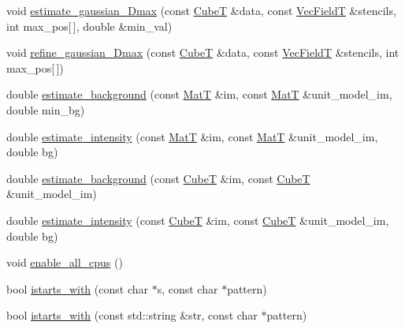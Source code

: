 \begin{DoxyCompactItemize}
\item 
void \hyperlink{namespacemappel_a2d597c426bd6287ad1a506511a68c9c2}{estimate\+\_\+gaussian\+\_\+Dmax} (const \hyperlink{namespacemappel_ab2afab4e6c8805e83946670d882768c2}{CubeT} \&data, const \hyperlink{namespacemappel_a834ec4f32487f07c0ca1e22d4928d1f8}{Vec\+FieldT} \&stencils, int max\+\_\+pos\mbox{[}$\,$\mbox{]}, double \&min\+\_\+val)
\item 
void \hyperlink{namespacemappel_ab65cc5c100590b4b5246984162e3e678}{refine\+\_\+gaussian\+\_\+Dmax} (const \hyperlink{namespacemappel_ab2afab4e6c8805e83946670d882768c2}{CubeT} \&data, const \hyperlink{namespacemappel_a834ec4f32487f07c0ca1e22d4928d1f8}{Vec\+FieldT} \&stencils, int max\+\_\+pos\mbox{[}$\,$\mbox{]})
\item 
double \hyperlink{namespacemappel_ae4735b28fdcd3dafd492d565357f7641}{estimate\+\_\+background} (const \hyperlink{namespacemappel_a7091ab87c528041f7e2027195fad8915}{MatT} \&im, const \hyperlink{namespacemappel_a7091ab87c528041f7e2027195fad8915}{MatT} \&unit\+\_\+model\+\_\+im, double min\+\_\+bg)
\item 
double \hyperlink{namespacemappel_acc51debd218d0e3181f7ddf32576f739}{estimate\+\_\+intensity} (const \hyperlink{namespacemappel_a7091ab87c528041f7e2027195fad8915}{MatT} \&im, const \hyperlink{namespacemappel_a7091ab87c528041f7e2027195fad8915}{MatT} \&unit\+\_\+model\+\_\+im, double bg)
\item 
double \hyperlink{namespacemappel_a5066b92cf654828129635a6ca61aaca4}{estimate\+\_\+background} (const \hyperlink{namespacemappel_ab2afab4e6c8805e83946670d882768c2}{CubeT} \&im, const \hyperlink{namespacemappel_ab2afab4e6c8805e83946670d882768c2}{CubeT} \&unit\+\_\+model\+\_\+im)
\item 
double \hyperlink{namespacemappel_a2d00c518aa213c069f09c666c25b026a}{estimate\+\_\+intensity} (const \hyperlink{namespacemappel_ab2afab4e6c8805e83946670d882768c2}{CubeT} \&im, const \hyperlink{namespacemappel_ab2afab4e6c8805e83946670d882768c2}{CubeT} \&unit\+\_\+model\+\_\+im, double bg)
\item 
void \hyperlink{namespacemappel_aba8aaabfad30754642d7d5ba791e4e37}{enable\+\_\+all\+\_\+cpus} ()
\item 
bool \hyperlink{namespacemappel_a610296a93ba507763bc770d39049f323}{istarts\+\_\+with} (const char $\ast$s, const char $\ast$pattern)
\item 
bool \hyperlink{namespacemappel_ab9264c8a764d4c5f4e3dd4343055d7d3}{istarts\+\_\+with} (const std\+::string \&str, const char $\ast$pattern)

\end{DoxyCompactItemize}
